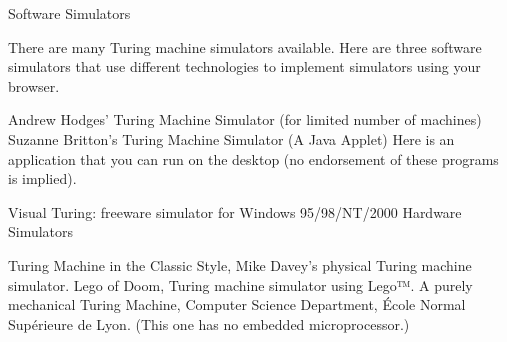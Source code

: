 Software Simulators

There are many Turing machine simulators available. Here are three software simulators that use different technologies to implement simulators using your browser.

Andrew Hodges' Turing Machine Simulator (for limited number of machines)
Suzanne Britton's Turing Machine Simulator (A Java Applet)
Here is an application that you can run on the desktop (no endorsement of these programs is implied).

Visual Turing: freeware simulator for Windows 95/98/NT/2000
Hardware Simulators

Turing Machine in the Classic Style, Mike Davey's physical Turing machine simulator.
Lego of Doom, Turing machine simulator using Lego™.
A purely mechanical Turing Machine, Computer Science Department, École Normal Supérieure de Lyon. (This one has no embedded microprocessor.)